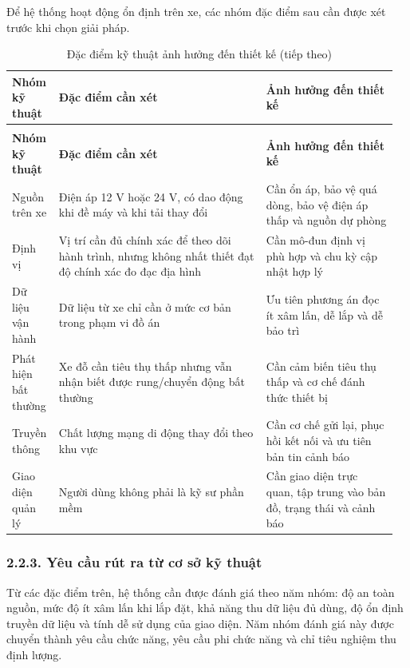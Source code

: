\documentclass[a4paper]{extarticle}
\newcommand{\thesissettableid}[2]{%
  \renewcommand{\thetable}{#1}%
  \renewcommand{\theHtable}{#2}%
}
\begin{document}
Để hệ thống hoạt động ổn định trên xe, các nhóm đặc điểm sau cần được xét trước khi chọn giải pháp.

{\thesissettableid{2.2}{condensed-bang-2-2-dac-diem-ky-thuat-anh-huong-den-thiet-ke}
\def\LTcaptype{table}
\begin{longtable}{|L{0.101\linewidth}|L{0.528\linewidth}|L{0.33\linewidth}|}
\caption{Đặc điểm kỹ thuật ảnh hưởng đến thiết kế}\label{tab:condensed-bang-2-2-dac-diem-ky-thuat-anh-huong-den-thiet-ke}\\
\hline
\textbf{Nhóm kỹ thuật} & \textbf{Đặc điểm cần xét} & \textbf{Ảnh hưởng đến thiết kế} \\
\hline
\endfirsthead
\caption[]{Đặc điểm kỹ thuật ảnh hưởng đến thiết kế (tiếp theo)}\\
\hline
\textbf{Nhóm kỹ thuật} & \textbf{Đặc điểm cần xét} & \textbf{Ảnh hưởng đến thiết kế} \\
\hline
\endhead
\endfoot
\endlastfoot
Nguồn trên xe & Điện áp 12 V hoặc 24 V, có dao động khi đề máy và khi tải thay đổi & Cần ổn áp, bảo vệ quá dòng, bảo vệ điện áp thấp và nguồn dự phòng \\\hline
Định vị & Vị trí cần đủ chính xác để theo dõi hành trình, nhưng không nhất thiết đạt độ chính xác đo đạc địa hình & Cần mô-đun định vị phù hợp và chu kỳ cập nhật hợp lý \\\hline
Dữ liệu vận hành & Dữ liệu từ xe chỉ cần ở mức cơ bản trong phạm vi đồ án & Ưu tiên phương án đọc ít xâm lấn, dễ lắp và dễ bảo trì \\\hline
Phát hiện bất thường & Xe đỗ cần tiêu thụ thấp nhưng vẫn nhận biết được rung/chuyển động bất thường & Cần cảm biến tiêu thụ thấp và cơ chế đánh thức thiết bị \\\hline
Truyền thông & Chất lượng mạng di động thay đổi theo khu vực & Cần cơ chế gửi lại, phục hồi kết nối và ưu tiên bản tin cảnh báo \\\hline
Giao diện quản lý & Người dùng không phải là kỹ sư phần mềm & Cần giao diện trực quan, tập trung vào bản đồ, trạng thái và cảnh báo \\\hline
\end{longtable}
}

\subsubsection{2.2.3. Yêu cầu rút ra từ cơ sở kỹ thuật}\label{yuxeau-cux1ea7u-ruxfat-ra-tux1eeb-cux1a1-sux1edf-kux1ef9-thuux1eadt}

Từ các đặc điểm trên, hệ thống cần được đánh giá theo năm nhóm: độ an toàn nguồn, mức độ ít xâm lấn khi lắp đặt, khả năng thu dữ liệu đủ dùng, độ ổn định truyền dữ liệu và tính dễ sử dụng của giao diện. Năm nhóm đánh giá này được chuyển thành yêu cầu chức năng, yêu cầu phi chức năng và chỉ tiêu nghiệm thu định lượng.
\end{document}

